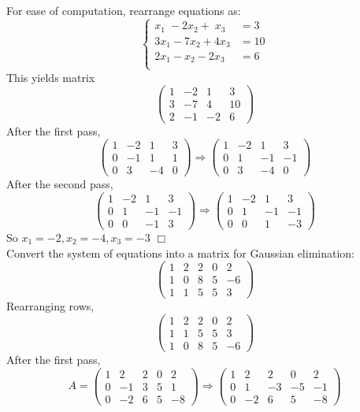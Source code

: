 \documentclass{article}
\begin{document}
\section{}
For ease of computation, rearrange equations as:
\begin{equation*}
    \begin{cases}
        x_1 \; - 2x_2 + \;x_3 &= 3\\
        3x_1 - 7x_2 + 4x_3 &= 10\\
        2x_1 - x_2 - 2x_3 &= 6\\
    \end{cases}
\end{equation*}
This yields matrix
$$\left(\begin{matrix}1&-2&1&3\\3&-7&4&10\\2&-1&-2&6\end{matrix}\right) $$
After the first pass,
$$ \left(\begin{matrix}1&-2&1&3\\0&-1&1&1\\0&3&-4&0\end{matrix}\right) \Rightarrow \left(\begin{matrix}1&-2&1&3\\0&1&-1&-1\\0&3&-4&0\end{matrix}\right) $$
After the second pass,
$$\left(\begin{matrix}1&-2&1&3\\0&1&-1&-1\\0&0&-1&3\end{matrix}\right) \Rightarrow \left(\begin{matrix}1&-2&1&3\\0&1&-1&-1\\0&0&1&-3\end{matrix}\right) $$
So $x_1 = -2, x_2 = -4, x_3 = -3$ $\Box$
\\
Convert the system of equations into a matrix for Gaussian elimination:
$$\left(\begin{matrix}1&2&2&0&2\\1&0&8&5&-6\\1&1&5&5&3\end{matrix}\right) $$
Rearranging rows,
$$\left(\begin{matrix}1&2&2&0&2\\1&1&5&5&3\\1&0&8&5&-6\end{matrix}\right) $$
After the first pass,
$$ A= \left(\begin{matrix}1&2&2&0&2\\0&-1&3&5&1\\0&-2&6&5&-8\end{matrix}\right) \Rightarrow \left(\begin{matrix}1&2&2&0&2\\0&1&-3&-5&-1\\0&-2&6&5&-8\end{matrix}\right) $$
\end{document}
